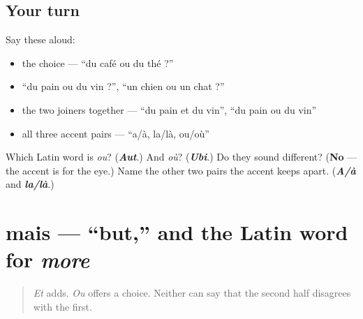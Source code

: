 \subsection*{Your turn}
Say these aloud:

\begin{itemize}
\raggedright
  \item the choice — \textquotedblleft{}du café ou du thé ?\textquotedblright{}
  \item \textquotedblleft{}du pain ou du vin ?\textquotedblright{}, \textquotedblleft{}un chien ou un chat ?\textquotedblright{}
  \item the two joiners together — \textquotedblleft{}du pain et du vin\textquotedblright{}, \textquotedblleft{}du pain ou du vin\textquotedblright{}
  \item all three accent pairs — \textquotedblleft{}a/à, la/là, ou/où\textquotedblright{}
\end{itemize}

\begin{tcolorbox}[breakable,colback=teal!4,colframe=teal!35!black,title={Before you move on}]
Which Latin word is \emph{ou}? (\emph{\textbf{Aut}}.) And \emph{où}? (\emph{\textbf{Ubi}}.) Do they sound different? (\textbf{No} — the accent is for the eye.) Name the other two pairs the accent keeps apart. (\emph{\textbf{A/à}} and \emph{\textbf{la/là}}.)
\end{tcolorbox}
\section[mais]{mais — \textquotedblleft{}but,\textquotedblright{} and the Latin word for \emph{more}}

\label{lesson:FR-C36-mais}



\begin{quote}
\emph{Et} adds. \emph{Ou} offers a choice. Neither can say that the second half disagrees with the first.
\end{quote}

